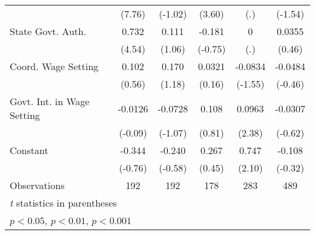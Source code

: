 \begin{table}[htbp]
\begin{tabular}{l*{5}{c}}
                                        &   (7.76)         &  (-1.02)         &   (3.60)         &      (.)         &  (-1.54)         \\
\addlinespace
State Govt. Auth.                       &    0.732\sym{***}&    0.111         &   -0.181         &        0         &   0.0355         \\
                                        &   (4.54)         &   (1.06)         &  (-0.75)         &      (.)         &   (0.46)         \\
\addlinespace
Coord. Wage Setting                     &    0.102         &    0.170         &   0.0321         &  -0.0834         &  -0.0484         \\
                                        &   (0.56)         &   (1.18)         &   (0.16)         &  (-1.55)         &  (-0.46)         \\
\addlinespace
Govt. Int. in Wage Setting              &  -0.0126         &  -0.0728         &    0.108         &   0.0963\sym{*}  &  -0.0307         \\
                                        &  (-0.09)         &  (-1.07)         &   (0.81)         &   (2.38)         &  (-0.62)         \\
\addlinespace
Constant                                &   -0.344         &   -0.240         &    0.267         &    0.747\sym{*}  &   -0.108         \\
                                        &  (-0.76)         &  (-0.58)         &   (0.45)         &   (2.10)         &  (-0.32)         \\
\midrule
Observations                            &      192         &      192         &      178         &      283         &      489         \\
\bottomrule
\multicolumn{6}{l}{\footnotesize \textit{t} statistics in parentheses}\\
\multicolumn{6}{l}{\footnotesize \sym{*} \(p<0.05\), \sym{**} \(p<0.01\), \sym{***} \(p<0.001\)}\\
\end{tabular}
\end{table}
